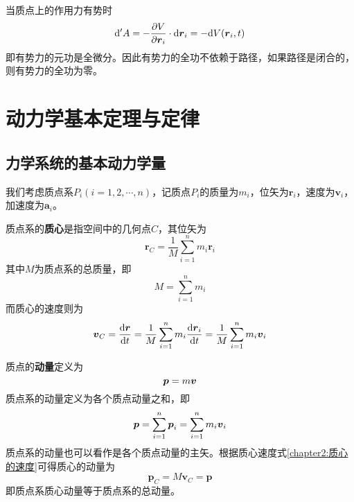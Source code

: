 当质点上的作用力有势时
\begin{equation}
	\mathrm{d}'A = -\frac{\partial V}{\partial \boldsymbol{r}_i} \cdot \mathrm{d}\boldsymbol{r}_i = -\mathrm{d} V(\boldsymbol{r}_i,t)
	\label{chapter2:外力有势时的元功是全微分}
\end{equation}
即有势力的元功是全微分。因此有势力的全功不依赖于路径，如果路径是闭合的，则有势力的全功为零。


\section{动力学基本定理与定律}

\subsection{力学系统的基本动力学量}

我们考虑质点系$P_i(i=1,2,\cdots,n)$，记质点$P_i$的质量为$m_i$，位矢为$\boldsymbol{r}_i$，速度为$\boldsymbol{v}_i$，加速度为$\boldsymbol{a}_i$。

质点系的{\bf 质心}是指空间中的几何点$C$，其位矢为
\begin{equation}
	\boldsymbol{r}_C = \frac{1}{M}\sum_{i=1}^nm_i\boldsymbol{r}_i
\end{equation}
其中$M$为质点系的总质量，即
\begin{equation}
	M = \sum_{i=1}^nm_i
\end{equation}
而质心的速度则为
\begin{equation}
	\boldsymbol{v}_C = \frac{\mathrm{d}\boldsymbol{r}}{\mathrm{d} t} = \frac{1}{M}\sum_{i=1}^nm_i\frac{\mathrm{d}\boldsymbol{r}_i}{\mathrm{d} t} = \frac{1}{M}\sum_{i=1}^nm_i\boldsymbol{v}_i
	\label{chapter2:质心的速度}
\end{equation}

质点的{\bf 动量}定义为
\begin{equation}
	\boldsymbol{p} = m\boldsymbol{v}
\end{equation}
质点系的动量定义为各个质点动量之和，即
\begin{equation}
	\boldsymbol{p} = \sum_{i=1}^n \boldsymbol{p}_i = \sum_{i=1}^nm_i\boldsymbol{v}_i
\end{equation}
质点系的动量也可以看作是各个质点动量的主矢。根据质心速度式\eqref{chapter2:质心的速度}可得质心的动量为
\begin{equation}
	\boldsymbol{p}_C = M\boldsymbol{v}_C = \boldsymbol{p}
	\label{chapter2:质心动量表达式}
\end{equation}
即质点系质心动量等于质点系的总动量。

